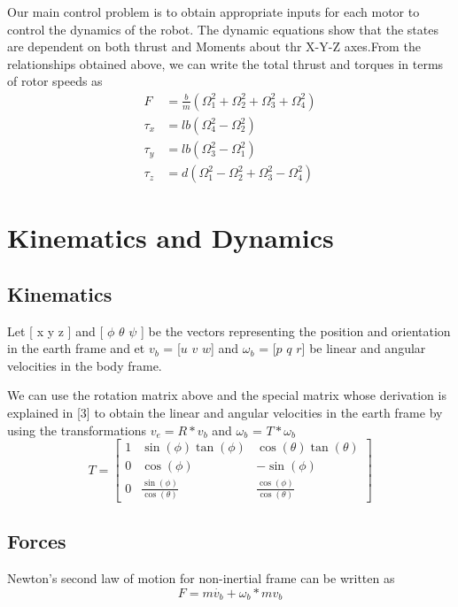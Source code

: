 Our main control problem is to obtain appropriate inputs for each motor to control the dynamics of the robot. The dynamic equations show that the states are dependent on both thrust and Moments about thr X-Y-Z axes.From the relationships obtained above, we can write the total thrust and torques in terms of rotor speeds as
\begin{align*}
  F & = \frac{b}{m}(\Omega_1^2+ \Omega_2^2 + \Omega_3^2 + \Omega_4^2 )\\
  \tau_x & = lb(\Omega_4^2 - \Omega_2^2)\\
  \tau_y & = lb(\Omega_3^2 - \Omega_1^2)\\
  \tau_z & = d(\Omega_1^2 - \Omega_2^2 + \Omega_3^2 - \Omega_4^2)
\end{align*}
\section{Kinematics and Dynamics}
\subsection{Kinematics}
Let [ x y z ] and [ $\phi$ $\theta$ $\psi$ ] be the vectors representing the position and orientation in the earth frame and et $v_b$ = [$u$ $v$ $w$] and $\omega_b$ = [$p$ $q$ $r$] be linear and angular velocities in the body frame.

We can use the rotation matrix above and the special matrix whose derivation is explained in [3] to obtain the linear and angular velocities in the earth frame by using the transformations $ v_e = R*v_b  $  and $\omega_b$ = $T*\omega_b$
\begin{equation}
  T = \left[ \begin{matrix}
        1 & \sin(\phi)\tan(\phi) & \cos(\theta)\tan(\theta)  \\
        0 & \cos(\phi) & -\sin(\phi)\\
        0 & \frac{\sin(\phi)}{\cos(\theta)} & \frac{\cos(\phi)}{\cos(\theta)}
      \end{matrix}
      \right]
\end{equation}
\subsection{Forces}
Newton's second law of motion for non-inertial frame can be written as
\begin{equation*}
  F = m\dot{v_b}+\omega_b*mv_b
\end{equation*}

